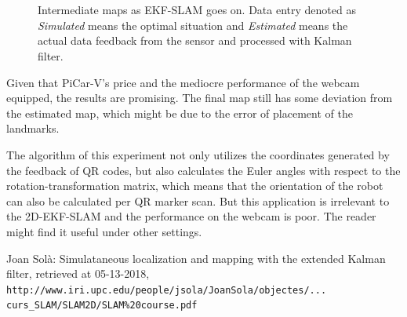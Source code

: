 \documentclass[12pt]{article}
\begin{document}
\begin{figure}[h]
 \\
 \\
\caption{Intermediate maps as EKF-SLAM goes on. Data entry denoted as \textit{Simulated} means the optimal situation and \textit{Estimated} means the actual data feedback from the sensor and processed with Kalman filter.}
\label{some}
\end{figure}



Given that PiCar-V's price and the mediocre performance of the webcam equipped, the results are promising. The final map still has some deviation from the estimated map, which might be due to the error of placement of the landmarks. 

The algorithm of this experiment not only utilizes the coordinates generated by the feedback of QR codes, but also calculates the Euler angles with respect to the rotation-transformation matrix, which means that the orientation of the robot can also be calculated per QR marker scan. But this application is irrelevant to the 2D-EKF-SLAM and the performance on the webcam is poor. The reader might find it useful under other settings.
 

\clearpage
\begin{thebibliography}{9}

Joan Sol\`a: Simulataneous localization and mapping
with the extended Kalman filter, retrieved at 05-13-2018,
\\\texttt{http://www.iri.upc.edu/people/jsola/JoanSola/objectes/...\\curs\_SLAM/SLAM2D/SLAM\%20course.pdf}
\end{thebibliography}


 
\end{document}
